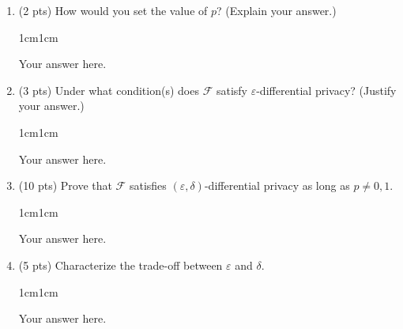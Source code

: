 \documentclass[11pt,letterpaper]{article}
\newenvironment{answer}{\em \color{blue} \begin{adjustwidth}{1cm}{1cm}}{\end{adjustwidth}}
\newcommand{\mc}[1]{\mathcal{#1}}	%
\begin{document}
%
\begin{enumerate}
%
	\item (2 pts) How would you set the value of $p$? (Explain your answer.)

	\begin{answer}
	
		Your answer here.
		
	\end{answer}
	
	
	\item (3 pts) Under what condition(s) does $\mc{F}$ satisfy $\varepsilon$-differential privacy? (Justify your answer.)
	
	\begin{answer}
	
		Your answer here.
		
	\end{answer}
	
	
	\item (10 pts) Prove that $\mc{F}$ satisfies $(\varepsilon,\delta)$-differential privacy as long as $p \neq 0, 1$. 
	
	\begin{answer}
	
		Your answer here.
		
	\end{answer}
	
	
	\item (5 pts) Characterize the trade-off between $\varepsilon$ and $\delta$.
	
	\begin{answer}
	
		Your answer here.
		
	\end{answer}
			
		
%
\end{enumerate}
\end{document}
